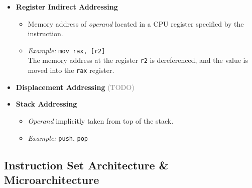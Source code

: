 \documentclass[12pt, letterpaper]{article}
\begin{document}
\begin{itemize}
\begin{itemize}
            \item \textit{Example:} \texttt{mov rax, r2} \\ The value at the register \texttt{r2} is moved into the \texttt{rax} register.
        \end{itemize}
    \item \textbf{Register Indirect Addressing}
        \begin{itemize}
            \item Memory address of \textit{operand} located in a CPU register specified by the instruction.
            \item \textit{Example:} \texttt{mov rax, [r2]} \\ The memory address at the register \texttt{r2} is dereferenced, and the value is moved into the \texttt{rax} register.
        \end{itemize}
    \item \textbf{Displacement Addressing} \textcolor{gray}{(TODO)}
    \item \textbf{Stack Addressing}
        \begin{itemize}
            \item \textit{Operand} implicitly taken from top of the stack.
            \item \textit{Example:} \texttt{push}, \texttt{pop}
        \end{itemize}
\end{itemize}

\subsection*{Instruction Set Architecture \& Microarchitecture}
\end{document}

